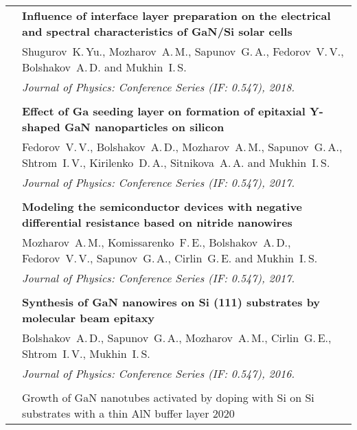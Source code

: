 \documentclass[letterpaper, 11pt]{article}
\begin{document}
\begin{longtable}{p{1.3in}p{4.8in}}
        & \textbf{Influence of interface layer preparation on the electrical
        and spectral characteristics of GaN/Si solar cells} \\
        & Shugurov~K.\,Yu., Mozharov~A.\,M., Sapunov~G.\,A., Fedorov~V.\,V.,
        Bolshakov~A.\,D. and Mukhin~I.\,S. \\
		& \textit{Journal of Physics: Conference Series (IF: 0.547), 2018.}\\
		& \\
		
        & \textbf{Effect of Ga seeding layer on formation of epitaxial Y-shaped
        GaN nanoparticles on silicon} \\
        & Fedorov~V.\,V., Bolshakov~A.\,D., Mozharov~A.\,M., Sapunov~G.\,A.,
        Shtrom~I.\,V., Kirilenko~D.\,A., Sitnikova~A.\,A. and Mukhin~I.\,S. \\
        & \textit{Journal of Physics: Conference Series (IF: 0.547), 2017.}\\
		& \\

        & \textbf{Modeling the semiconductor devices with negative differential
        resistance based on nitride nanowires} \\
        & Mozharov~A.\,M., Komissarenko~F.\,E., Bolshakov~A.\,D.,
        Fedorov~V.\,V., Sapunov~G.\,A., Cirlin~G.\,E. and Mukhin~I.\,S. \\
		& \textit{Journal of Physics: Conference Series (IF: 0.547), 2017.}\\
		& \\

        & \textbf{Synthesis of GaN nanowires on Si (111) substrates by
        molecular beam epitaxy} \\
        & Bolshakov~A.\,D., Sapunov~G.\,A., Mozharov~A.\,M., Cirlin~G.\,E.,
        Shtrom~I.\,V., Mukhin~I.\,S. \\
        & \textit{Journal of Physics: Conference Series (IF: 0.547), 2016.}\\
		& \\

		{\color{OliveGreen}{Patent}}
        & Growth of GaN nanotubes activated by doping with Si on Si substrates
        with a thin AlN buffer layer \hfill 2020\\
		
		
		
		
	\end{longtable}
\end{document}
